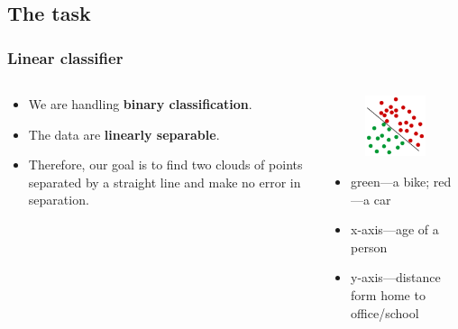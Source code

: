 \documentclass{beamer}
\begin{document}
\subsection{The task}
  \begin{frame}
    \frametitle{Linear classifier}
    \begin{columns}
      \begin{column}{5cm}
        \begin{itemize}
          \item We are handling \textbf{binary classification}.
          \item The data are \textbf{linearly separable}.
          \item Therefore, our goal is to find two clouds of points separated by a straight line and make no error in separation.
        \end{itemize}
      \end{column}
      \begin{column}{5cm}
        \begin{figure}
          \includegraphics[scale=.4]{graphics/presentation/clusters2e} 
        \end{figure}
        \begin{itemize}
          \item green---a bike; red---a car
          \item x-axis---age of a person
          \item y-axis---distance form home to office/school
        \end{itemize}
      \end{column}
    \end{columns}
  \end{frame}
\end{document}
